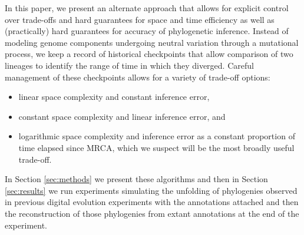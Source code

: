 In this paper, we present an alternate approach that allows for explicit control over trade-offs and hard guarantees for space and time efficiency as well as (practically) hard guarantees for accuracy of phylogenetic inference.
Instead of modeling genome components undergoing neutral variation through a mutational process, we keep a record of historical checkpoints that allow comparison of two lineages to identify the range of time in which they diverged.
Careful management of these checkpoints allows for a variety of trade-off options:
\begin{itemize}
  \item linear space complexity and constant inference error,
  \item constant space complexity and linear inference error, and
  \item logarithmic space complexity and inference error as a constant proportion of time elapsed since MRCA, which we suspect will be the most broadly useful trade-off.
\end{itemize}

In Section \ref{sec:methods} we present these algorithms and then in Section \ref{sec:results} we run experiments simulating the unfolding of phylogenies observed in previous digital evolution experiments with the annotations attached and then the reconstruction of those phylogenies from extant annotations at the end of the experiment.
